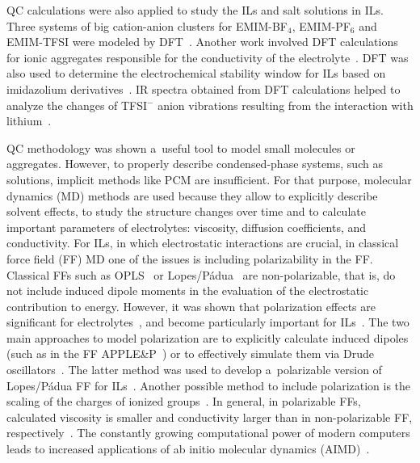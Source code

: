 QC calculations were also applied to study the ILs and salt solutions in ILs. Three systems of big cation-anion clusters for EMIM-BF$_4$, EMIM-PF$_6$ and EMIM-TFSI were modeled by DFT~\cite{li-il-dft-1}. Another work involved DFT calculations for ionic aggregates responsible for the conductivity of the electrolyte~\cite{li-il-dft-2}. DFT was also used to determine the electrochemical stability window for ILs based on imidazolium derivatives~\cite{li-il-stability-window-dft}. IR spectra obtained from DFT calculations helped to analyze the changes of TFSI$^{-}$ anion vibrations resulting from the interaction with lithium~\cite{lib-vibrational-modeling}.

QC methodology was shown a~useful tool to model small molecules or aggregates. However, to properly describe condensed-phase systems, such as solutions, implicit methods like PCM are insufficient. For that purpose, molecular dynamics (MD) methods are used because they allow to explicitly describe solvent effects, to study the structure changes over time and to calculate important parameters of electrolytes: viscosity, diffusion coefficients, and conductivity. For ILs, in which electrostatic interactions are crucial, in classical force field (FF) MD one of the issues is including polarizability in the FF. Classical FFs such as OPLS~\cite{ff-opls} or Lopes/P\'{a}dua~\cite{ff-lopes-padua} are non-polarizable, that is, do not include induced dipole moments in the evaluation of the electrostatic contribution to energy. However, it was shown that polarization effects are significant for electrolytes~\cite{borodin-old-1,borodin-old-2}, and become particularly important for ILs~\cite{ff-polarizability,na-dft-5}. The two main approaches to model polarization are to explicitly calculate induced dipoles (such as in the FF APPLE\&P~\cite{ff-applep}) or to effectively simulate them via Drude oscillators~\cite{ff-drude}. The latter method was used to develop a~polarizable version of Lopes/P\'{a}dua FF for ILs~\cite{ff-lopes-padua-polarizable}. Another possible method to include polarization is the scaling of the charges of ionized groups~\cite{ff-scaling-charges}. In general, in polarizable FFs, calculated viscosity is smaller and conductivity larger than in non-polarizable FF, respectively~\cite{ff-lopes-padua-polarizable}. The constantly growing computational power of modern computers leads to increased applications of ab initio molecular dynamics (AIMD)~\cite{aimd-perspectives-1,aimd-perspectives-2,aimd-perspectives-3}.

